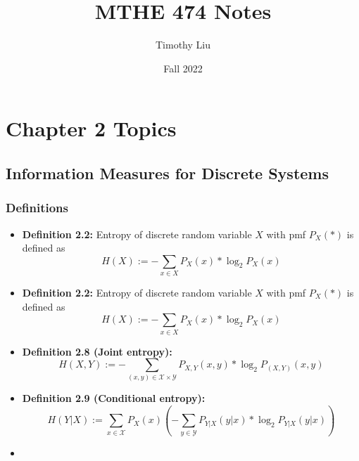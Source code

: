 \documentclass{article}
\begin{document}
\title{MTHE 474 Notes}
\author{Timothy Liu}
\date{Fall 2022}
\maketitle
\newpage

\tableofcontents

\newpage
\section{Chapter 2 Topics}
\subsection{Information Measures for Discrete Systems}
\subsubsection{Definitions}
\begin{flushleft}
    \begin{itemize}
   
    \item \textbf{Definition 2.2:} Entropy of discrete random variable \(X\) with pmf \(P_X(*)\) is defined as \[H(X):=-\sum_{x \in X}{P_X(x)*\log_{2}{P_X(x)}}\]

    \item \textbf{Definition 2.2:} Entropy of discrete random variable \(X\) with pmf \(P_X(*)\) is defined as \[H(X):=-\sum_{x \in X}{P_X(x)*\log_{2}{P_X(x)}}\]
    \item \textbf{Definition 2.8 (Joint entropy):} \[H(X,Y) := - \sum_{(x,y) \in \mathcal{X} \times \mathcal{Y}}{P_{X,Y}{(x,y)}*\log_{2}{P_{({X,Y})}{(x,y)}}}\]
    \item \textbf{Definition 2.9 (Conditional entropy):} \[H(Y|X) := \sum_{x \in \mathcal{X}} P_X(x) (-\sum_{y \in \mathcal{Y}} P_{Y|X}{(y|x)} * \log_{2}{P_{Y|X}{(y|x)}})\]
    \item 
    \end{itemize}
\end{flushleft}
\end{document}
